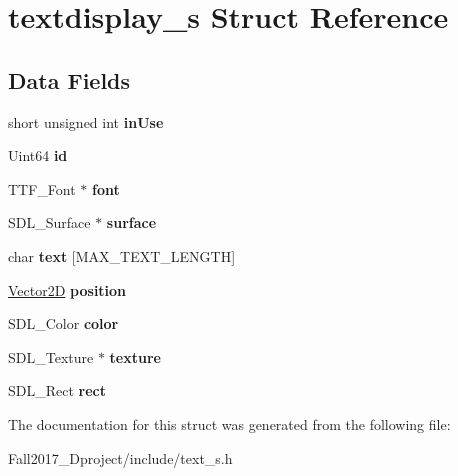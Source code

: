 \hypertarget{structtextdisplay__s}{}\section{textdisplay\+\_\+s Struct Reference}
\label{structtextdisplay__s}
\subsection*{Data Fields}
\begin{DoxyCompactItemize}
\item 
\mbox{\label{structtextdisplay__s_a13159f6b47122dc47eb11b1653a1663a}} 
short unsigned int {\bfseries in\+Use}
\item 
\mbox{\label{structtextdisplay__s_a4158e9a3af9337e59f9b8de984c0efba}} 
Uint64 {\bfseries id}
\item 
\mbox{\label{structtextdisplay__s_abf5bfa705e66ffc1ddaa6ce46c960873}} 
T\+T\+F\+\_\+\+Font $\ast$ {\bfseries font}
\item 
\mbox{\label{structtextdisplay__s_a2f5cac12e913bcfcff660305bf88dd3b}} 
S\+D\+L\+\_\+\+Surface $\ast$ {\bfseries surface}
\item 
\mbox{\label{structtextdisplay__s_a4746722d9d13b9cdc8b2146221816d54}} 
char {\bfseries text} \mbox{[}M\+A\+X\+\_\+\+T\+E\+X\+T\+\_\+\+L\+E\+N\+G\+TH\mbox{]}
\item 
\mbox{\label{structtextdisplay__s_a2dc349a13930beaf26472e0d04d9563e}} 
\hyperlink{struct_vector2_d}{Vector2D} {\bfseries position}
\item 
\mbox{\label{structtextdisplay__s_a631bf4babe4c1825a2cdc0c19c2bd04f}} 
S\+D\+L\+\_\+\+Color {\bfseries color}
\item 
\mbox{\label{structtextdisplay__s_a859b8efbf9abe8e82757ee5c75a0c97c}} 
S\+D\+L\+\_\+\+Texture $\ast$ {\bfseries texture}
\item 
\mbox{\label{structtextdisplay__s_a55aefd071649ac9dd8133e2d8a52d11f}} 
S\+D\+L\+\_\+\+Rect {\bfseries rect}
\end{DoxyCompactItemize}


The documentation for this struct was generated from the following file\+:\begin{DoxyCompactItemize}
\item 
Fall2017\+\_\+Dproject/include/text\+\_\+s.\+h\end{DoxyCompactItemize}
